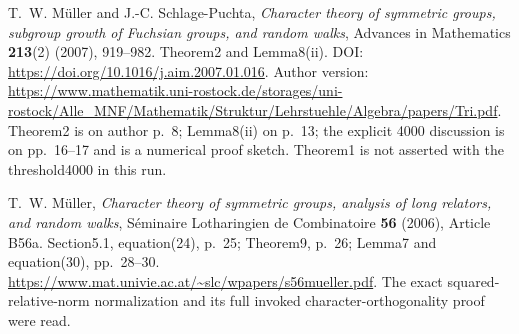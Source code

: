 T.~W. M\"uller and J.-C. Schlage-Puchta,
\emph{Character theory of symmetric groups, subgroup growth of Fuchsian
groups, and random walks}, Advances in Mathematics \textbf{213}(2)
(2007), 919--982. Theorem2 and Lemma8(ii).
DOI: \url{https://doi.org/10.1016/j.aim.2007.01.016}.
Author version: \url{https://www.mathematik.uni-rostock.de/storages/uni-rostock/Alle_MNF/Mathematik/Struktur/Lehrstuehle/Algebra/papers/Tri.pdf}.
Theorem2 is on author p.~8; Lemma8(ii) on p.~13; the explicit
4000 discussion is on pp.~16--17 and is a numerical proof sketch.
Theorem1 is not asserted with the threshold4000 in this run.

T.~W. M\"uller, \emph{Character theory of symmetric groups, analysis of
long relators, and random walks}, S\'eminaire Lotharingien de
Combinatoire \textbf{56} (2006), Article B56a.
Section5.1, equation(24), p.~25; Theorem9, p.~26;
Lemma7 and equation(30), pp.~28--30.
\url{https://www.mat.univie.ac.at/~slc/wpapers/s56mueller.pdf}.
The exact squared-relative-norm normalization and its full invoked
character-orthogonality proof were read.

